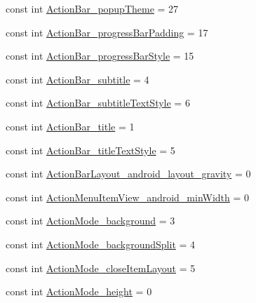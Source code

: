 \begin{DoxyCompactItemize}
\item 
const int \mbox{\hyperlink{class_f_w_p_s___app_1_1_droid_1_1_resource_1_1_styleable_ac05a6a695d574df1e15e0bb14a26c5ae}{Action\+Bar\+\_\+popup\+Theme}} = 27
\item 
const int \mbox{\hyperlink{class_f_w_p_s___app_1_1_droid_1_1_resource_1_1_styleable_a88556942df6a89cec5f200fed09861a6}{Action\+Bar\+\_\+progress\+Bar\+Padding}} = 17
\item 
const int \mbox{\hyperlink{class_f_w_p_s___app_1_1_droid_1_1_resource_1_1_styleable_ac96942a269e80d1edf533385435d9358}{Action\+Bar\+\_\+progress\+Bar\+Style}} = 15
\item 
const int \mbox{\hyperlink{class_f_w_p_s___app_1_1_droid_1_1_resource_1_1_styleable_a5214dc2a3da003ebdf01c0c4fa720876}{Action\+Bar\+\_\+subtitle}} = 4
\item 
const int \mbox{\hyperlink{class_f_w_p_s___app_1_1_droid_1_1_resource_1_1_styleable_ab39d9e944970d760a96d01a06afa2ec7}{Action\+Bar\+\_\+subtitle\+Text\+Style}} = 6
\item 
const int \mbox{\hyperlink{class_f_w_p_s___app_1_1_droid_1_1_resource_1_1_styleable_a3bb4e222731523d62340b668e3be0d26}{Action\+Bar\+\_\+title}} = 1
\item 
const int \mbox{\hyperlink{class_f_w_p_s___app_1_1_droid_1_1_resource_1_1_styleable_a7cb8575cc867d3b5b0955e11a9da52a4}{Action\+Bar\+\_\+title\+Text\+Style}} = 5
\item 
const int \mbox{\hyperlink{class_f_w_p_s___app_1_1_droid_1_1_resource_1_1_styleable_abc6db426605dd3513c539c7eb6eb07f3}{Action\+Bar\+Layout\+\_\+android\+\_\+layout\+\_\+gravity}} = 0
\item 
const int \mbox{\hyperlink{class_f_w_p_s___app_1_1_droid_1_1_resource_1_1_styleable_ac80500d852c204287f897791dd726881}{Action\+Menu\+Item\+View\+\_\+android\+\_\+min\+Width}} = 0
\item 
const int \mbox{\hyperlink{class_f_w_p_s___app_1_1_droid_1_1_resource_1_1_styleable_aab623868aa8728c3e18d237eaf8e8eb4}{Action\+Mode\+\_\+background}} = 3
\item 
const int \mbox{\hyperlink{class_f_w_p_s___app_1_1_droid_1_1_resource_1_1_styleable_af9164bad29ce69d004bf93b1fe10dafc}{Action\+Mode\+\_\+background\+Split}} = 4
\item 
const int \mbox{\hyperlink{class_f_w_p_s___app_1_1_droid_1_1_resource_1_1_styleable_a7f837bccb9c96382f74ac1f1fad496d5}{Action\+Mode\+\_\+close\+Item\+Layout}} = 5
\item 
const int \mbox{\hyperlink{class_f_w_p_s___app_1_1_droid_1_1_resource_1_1_styleable_a815ac55e95ee63a2291e234973fcaeef}{Action\+Mode\+\_\+height}} = 0

\end{DoxyCompactItemize}
